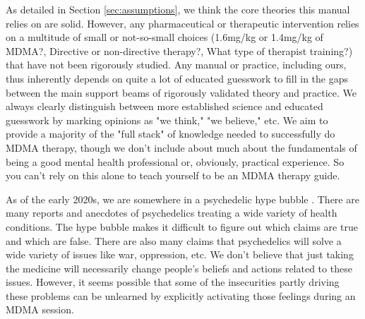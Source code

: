 \documentclass[12pt,letterpaper]{book}
\begin{document}
As detailed in Section \ref{sec:assumptions}, we think the core theories this manual relies on are solid. However, any pharmaceutical or therapeutic intervention relies on a multitude of small or not-so-small choices (1.6mg/kg or 1.4mg/kg of MDMA?, Directive or non-directive therapy?, What type of therapist training?) that have not been rigorously studied. Any manual or practice, including ours, thus inherently depends on quite a lot of educated guesswork to fill in the gaps between the main support beams of rigorously validated theory and practice. We always clearly distinguish between more established science and educated guesswork by marking opinions as "we think," "we believe," etc. We aim to provide a majority of the "full stack" of knowledge needed to successfully do MDMA therapy, though we don't include about much about the fundamentals of being a good mental health professional or, obviously, practical experience. So you can't rely on this alone to teach yourself to be an MDMA therapy guide.



As of the early 2020s, we are somewhere in a psychedelic hype bubble \cite{yaden2022preparing}. There are many reports and anecdotes of psychedelics treating a wide variety of health conditions. The hype bubble makes it difficult to figure out which claims are true and which are false. There are also many claims that psychedelics will solve a wide variety of issues like war, oppression, etc. We don't believe that just taking the medicine will necessarily change people's beliefs and actions related to these issues. However, it seems possible that some of the insecurities partly driving these problems can be unlearned by explicitly activating those feelings during an MDMA session.
\end{document}
